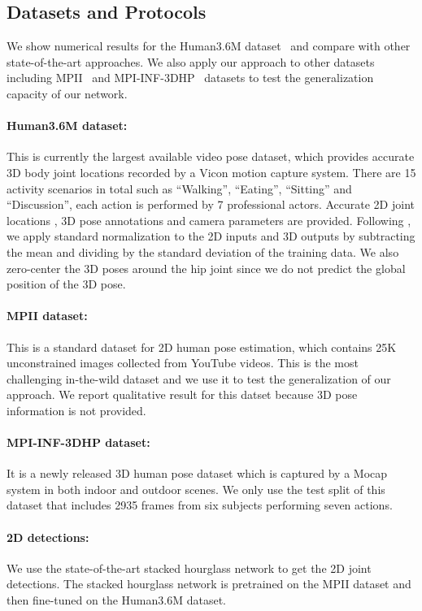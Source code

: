 \documentclass[10pt,twocolumn,letterpaper]{article}
\begin{document}
\subsection{Datasets and Protocols}
We show numerical results for the Human3.6M dataset~\cite{ionescu2014human3} and compare with other state-of-the-art approaches. We also apply our approach to other datasets including MPII~\cite{andriluka20142d} and MPI-INF-3DHP~\cite{mehta2017monocular} datasets to test the generalization capacity of our network.
\vspace{-3mm}
\paragraph{Human3.6M dataset: } This is currently the
largest available video pose dataset, which provides accurate 3D body
joint locations recorded by a Vicon motion capture system. There are 15 activity
scenarios in total such as ``Walking'', ``Eating'', ``Sitting'' and ``Discussion'', each action is performed by 7 professional actors. Accurate 2D joint locations , 3D pose annotations and camera parameters are provided. Following \cite{martinez2017simple}, we apply standard normalization to the 2D inputs and 3D outputs by subtracting the mean and dividing by the standard deviation of the training data. We also zero-center the 3D poses around the hip joint since we do not predict the global position of the 3D pose.
\vspace{-3mm}
\paragraph{MPII dataset:} This is a standard dataset for 2D human pose estimation, which contains 25K unconstrained images collected from YouTube videos. This is the most challenging in-the-wild dataset and we use it to test the generalization of our approach. We report qualitative result for this datset because 3D pose information is not provided.
\vspace{-3mm}
\paragraph{MPI-INF-3DHP dataset:} It is a newly released 3D human pose dataset which is captured by a Mocap system in both indoor and outdoor scenes. We only use the test split of this dataset that includes 2935 frames from six subjects performing seven actions.
\vspace{-3mm}
\paragraph{2D detections:} We use the state-of-the-art stacked hourglass network \cite{newell2016stacked} to get the 2D joint detections. The stacked hourglass network is pretrained on the MPII dataset and then fine-tuned on the Human3.6M dataset.
\vspace{-3mm}
\end{document}
